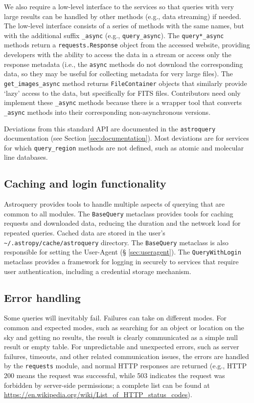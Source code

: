 \documentclass[twocolumn]{aastex62}
\newcommand{\package}[1]{\texttt{#1}\xspace}
\newcommand{\astroquery}{\package{astroquery}}
\begin{document}
We also require a low-level interface to the services so that queries
with very large results can be handled by other methods (e.g., data streaming)
if needed.
The low-level interface consists of a series of methods with the same
names, but with the additional suffix \texttt{\_async} (e.g.,
\texttt{query\_async}).  The
\texttt{query*\_async} methods return a \texttt{requests.Response} object
from the accessed website, providing developers with
the ability to access the data in a stream or access only the response
metadata (i.e., the \texttt{async} methods do not download the corresponding
data, so they may be useful for collecting metadata for very large files).  The
\texttt{get\_images\_async} method returns
\texttt{FileContainer} objects that similarly provide `lazy' access to the
data, but specifically for FITS files.  Contributors need only implement
these \texttt{\_async} methods because there is a wrapper tool that converts
\texttt{\_async} methods into their corresponding non-asynchronous versions.

Deviations from this standard API are documented in the \astroquery
documentation (see Section \ref{sec:documentation}).  Most deviations
are for services for which \texttt{query\_region} methods are not defined,
such as atomic and molecular line databases.

\subsection{Caching and login functionality}
Astroquery provides tools to handle multiple aspects of querying that are
common to all modules.  The \texttt{BaseQuery} metaclass provides tools for
caching requests and downloaded data, reducing the duration and the network
load for repeated queries.  Cached data are stored in the user's
\texttt{\textasciitilde/.astropy/cache/astroquery} directory.  The
\texttt{BaseQuery} metaclass is also responsible for setting the User-Agent (\S
\ref{sec:useragent}).  The \texttt{QueryWithLogin} metaclass provides a
framework for logging in securely to services that require user
authentication, including a credential storage mechanism.

\subsection{Error handling}
Some queries will inevitably fail.  Failures can take on different modes.  For
common and expected modes, such as searching for an object or location on the
sky and getting no results, the result is clearly communicated as a simple null
result or empty table.  For unpredictable and unexpected errors, such as server
failures, timeouts, and other related communication issues, the errors are handled
by the \texttt{requests} module, and normal HTTP responses are returned (e.g.,
HTTP 200 means the request was successful, while 503 indicates the request
was forbidden by server-side permissions;  a complete list can be found at
\url{https://en.wikipedia.org/wiki/List_of_HTTP_status_codes}).
\end{document}
